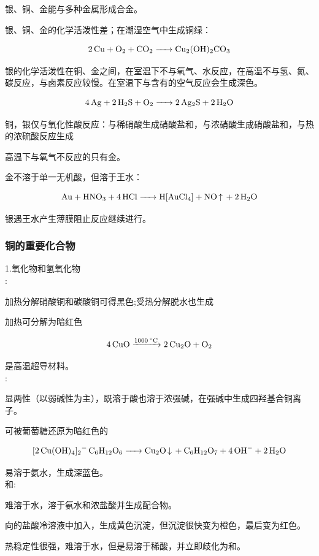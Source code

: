 \documentclass[a4paper,UTF8]{article}
\begin{document}
银、铜、金能与多种金属形成合金。

银、铜、金的化学活泼性差；在潮湿空气中生成铜绿：

$$ \ce{2Cu + O2 + CO2 -> Cu2(OH)2CO3} $$

银的化学活泼性在铜、金之间，在室温下不与氧气、水反应，在高温不与氢、氮、碳反应，与卤素反应较慢。在室温下与含有的空气反应会生成深色。

$$ \ce{4Ag + 2H2S + O2 -> 2Ag2S + 2H2O} $$

铜，银仅与氧化性酸反应：与稀硝酸生成硝酸盐和，与浓硝酸生成硝酸盐和，与热的浓硫酸反应生成

高温下与氧气不反应的只有金。

金不溶于单一无机酸，但溶于王水：

$$ \ce{Au + HNO3 + 4HCl ->H[AuCl4] + NO\ce{^} + 2H2O} $$

银遇王水产生薄膜阻止反应继续进行。

\subsubsection{铜的重要化合物}
1.氧化物和氢氧化物\\

:

加热分解硝酸铜和碳酸铜可得黑色;受热分解脱水也生成

加热可分解为暗红色

$$ \ce{4CuO ->[1000^\circ C] 2Cu2O + O2} $$

是高温超导材料。\\

:

显两性（以弱碱性为主），既溶于酸也溶于浓强碱，在强碱中生成四羟基合铜离子。

可被葡萄糖还原为暗红色的

$$ \ce{[2Cu(OH)4]2- C6H12O6 -> Cu2O\ce{v} + C6H12O7 + 4OH- + 2H2O} $$

易溶于氨水，生成深蓝色。\\

和:

难溶于水，溶于氨水和浓盐酸并生成配合物。

向的盐酸冷溶液中加入，生成黄色沉淀，但沉淀很快变为橙色，最后变为红色。

热稳定性很强，难溶于水，但是易溶于稀酸，并立即歧化为和。
\end{document}
